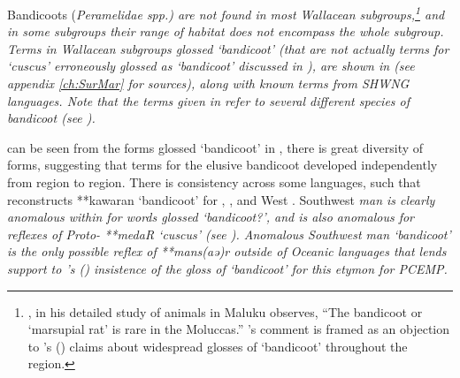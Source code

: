 Bandicoots (\it{Peramelidae spp.}) are not found in most
Wallacean subgroups,\footnote{
		\citet[197]{Ellen1993}, in his detailed study of animals in Maluku observes,
		“The bandicoot or ‘marsupial rat’ is rare in the Moluccas.” \citeauthor{Ellen1993}’s
		comment is framed as an objection to \citeauthor{Blust1982}'s (\citeyear[241]{Blust1982}) claims
		about widespread glosses of ‘bandicoot’ throughout the region.}
and in some subgroups their range of habitat does not encompass the whole subgroup.
Terms in Wallacean subgroups glossed ‘bandicoot’ (that are not
actually terms for ‘cuscus’ erroneously glossed as ‘bandicoot’
discussed in ), are shown in  (see appendix \ref{ch:SurMar} for sources),
along with known terms from SHWNG languages.
Note that the terms given in  refer to several different species
of bandicoot (see \citealp[268]{Schapper2011}).

 can be seen from the forms glossed ‘bandicoot’ in ,
there is great diversity of forms,
suggesting that terms for the elusive bandicoot developed independently
from region to region.
There is consistency across some  languages,
such that \citet[267]{Schapper2011} reconstructs **kawaran ‘bandicoot’
for , , and West .
Southwest  \it{man} is clearly anomalous within  for
words glossed ‘bandicoot?’, and is also anomalous for
reflexes of Proto- **medaR ‘cuscus’ (see ).
Anomalous Southwest  \it{man} ‘bandicoot’ is the only
possible reflex of **mans(aə)r outside of Oceanic languages that
lends support to \citeauthor{Blust1982}’s (\citeyear{Blust1982,Blust2012b})
insistence of the gloss of ‘bandicoot’ for this etymon
for PCEMP.

